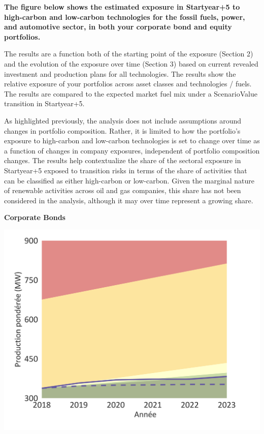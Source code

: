 \documentclass[10pt,table,a4]{article}\usepackage[]{graphicx}\usepackage[]{color}
\begin{document}
	\begin{multicols}{2}
		\textbf{The figure below shows the estimated exposure in Startyear+5 to high-carbon and low-carbon technologies for the fossil fuels, power, and automotive sector, in both your corporate bond and equity portfolios. }
		
		The results are a function both of the starting point of the exposure (Section 2) and the evolution of the exposure over time (Section 3) based on current revealed investment and production plans for all technologies. The results show the relative exposure of your portfolios across asset classes and technologies / fuels. The results are compared to the expected market fuel mix under a ScenarioValue transition in Startyear+5. 
		
		As highlighted previously, the analysis does not include assumptions around changes in portfolio composition. Rather, it is limited to how the portfolio's  exposure to high-carbon and low-carbon technologies is set to change over time as a function of changes in company exposures, independent of portfolio composition changes. The results help contextualize the share of the sectoral exposure in Startyear+5 exposed to transition risks in terms of the share of activities that can be classified as either high-carbon or low-carbon. Given the marginal nature of renewable activities across oil and gas companies, this share has not been considered in the analysis, although it may over time represent a growing share. 
		
	\end{multicols}
	
	\textbf{Corporate Bonds}
	
	
	\begin{center}
		\includegraphics[trim = {0 0cm 0 0},width=1\linewidth]{ReportOutputs/Fig09}
	\end{center}
	
\end{document}
